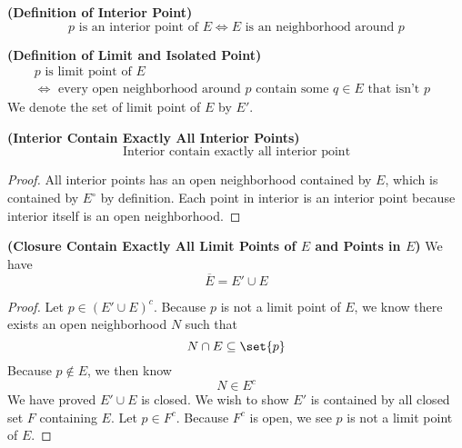 \documentclass{report}
\begin{document}
\begin{definition}
\label{2.2.4}
\textbf{(Definition of Interior Point)} 
\begin{equation*}
\text{ $p$ is an interior point of }E\iff E \text{ is an neighborhood around  $p$ }
\end{equation*}
\end{definition}
\begin{definition}
\label{2.2.5}
\textbf{(Definition of Limit and Isolated Point)} 
\begin{gather*}
p\text{ is limit point of $E$ }\\
\iff \text{ every open neighborhood around $p$ contain some $q\in E$ that isn't $p$ }
\end{gather*}
We denote the set of limit point of $E$ by  $E'$. 
\end{definition}
\begin{theorem}
\label{2.2.6}
\textbf{(Interior Contain Exactly All Interior Points)} 
\begin{equation*}
\text{ Interior contain exactly all interior point }
\end{equation*}
\end{theorem}
\begin{proof}
All interior points has an open neighborhood contained by $E$, which is contained by  $E^\circ $ by definition. Each point in interior is an interior point because interior itself is an open neighborhood.
\end{proof}
\begin{theorem}
\label{2.2.7}
\textbf{(Closure Contain Exactly All Limit Points of $E$ and Points in $E$)} We have
\begin{equation*}
\overline{E}= E' \cup  E
\end{equation*}
\end{theorem}
\begin{proof}
Let $p\in (E'\cup E)^c$. Because $p$ is not a limit point of  $E$, we know there exists an open neighborhood $N$ such that
 \begin{equation*}
N\cap E\subseteq \set{p}
\end{equation*}
Because $p\not\in E$, we then know
\begin{equation*}
N\in E^c
\end{equation*}
We have proved $E'\cup E$ is closed. We wish to show  $E'$ is contained by all closed set $F$ containing  $E$. Let $p\in F^c$. Because $F^c$ is open, we see  $p$ is not a limit point of  $E$.  
\end{proof}
\end{document}
